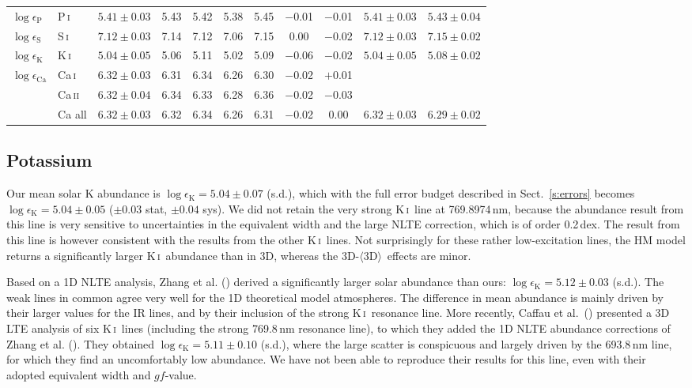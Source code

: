 \documentclass[traditabstract]{aa}
\newcommand{\ph}{\phantom{$-$}}
\newcommand{\oneDAV}{$\langle\mathrm{3D}\rangle$}
\newcommand{\altphosi}{P\,\textsc{i}}
\newcommand{\altsuli}{S\,\textsc{i}}
\newcommand{\altki}{K\,\textsc{i}}
\newcommand{\altcai}{Ca\,\textsc{i}}
\newcommand{\altcaii}{Ca\,\textsc{ii}}
\newcommand{\phosi}{\altphosi\ }
\newcommand{\suli}{\altsuli\ }
\newcommand{\ki}{\altki\ }
\newcommand{\cai}{\altcai\ }
\newcommand{\caii}{\altcaii\ }
\begin{document}
\begin{table}[tbp]
\begin{tabular}{l l c c c c c c c c c}
$\log \epsilon_\mathrm{P}$      & \phosi&  $5.41\pm0.03$ & 5.43 & 5.42 & 5.38 & 5.45 & $-$0.01 & $-$0.01 & $5.41\pm0.03$ & $5.43\pm0.04$ \vspace{1mm}\\
$\log \epsilon_\mathrm{S}$      & \suli &  $7.12\pm0.03$ & 7.14 & 7.12 & 7.06 & 7.15 & \ph0.00 & $-$0.02 & $7.12\pm0.03$ & $7.15\pm0.02$ \vspace{1mm}\\
$\log \epsilon_\mathrm{K}$      & \ki   &  $5.04\pm0.05$ & 5.06 & 5.11 & 5.02 & 5.09 & $-$0.06 & $-$0.02 & $5.04\pm0.05$ & $5.08\pm0.02$ \vspace{1mm}\\
$\log \epsilon_\mathrm{Ca}$     & \cai  &  $6.32\pm0.03$ & 6.31 & 6.34 & 6.26 & 6.30 & $-$0.02 & $+$0.01 & \\
                                			& \caii &  $6.32\pm0.04$ & 6.34 & 6.33 & 6.28 & 6.36 & $-$0.02 & $-$0.03 & \\
                                			& Ca all&  $6.32\pm0.03$ & 6.32 & 6.34 & 6.26 & 6.31 & $-$0.02 & \ph0.00 &  $6.32\pm0.03$ & $6.29\pm0.02$ \vspace{0.5mm}\\
\hline
\end{tabular}
\end{table}


\subsection{Potassium}
Our mean solar K abundance is $\log\epsilon_{\mathrm{K}} = 5.04 \pm  0.07$ (s.d.), which with the full error budget described in Sect.~\ref{s:errors} becomes $\log\epsilon_{\mathrm{K}} = 5.04 \pm 0.05$ ($\pm 0.03$ stat, $\pm 0.04$ sys). We did not retain the very strong \ki line at 769.8974\,nm, because the abundance result from this line is very sensitive to uncertainties in the equivalent width and the large NLTE correction, which is of order 0.2\,dex. The result from this line is however consistent with the results from the other \ki lines.  Not surprisingly for these rather low-excitation lines, the HM model returns a significantly larger \ki abundance than in 3D, whereas the 3D-\oneDAV\ effects are minor.

Based on a 1D NLTE analysis, Zhang et al. (\cite{zhan}) derived a significantly larger solar abundance than ours: $\log\epsilon_{\mathrm{K}} = 5.12 \pm  0.03$ (s.d.).  The weak lines in common agree very well for the 1D theoretical model atmospheres.  The difference in mean abundance is mainly driven by their larger values for the IR lines, and by their inclusion of the strong \ki resonance line.  More recently, Caffau et al.\ (\cite{caf4}) presented a 3D LTE analysis of six \ki lines (including the strong 769.8\,nm resonance line), to which they added the 1D NLTE abundance corrections of Zhang et al. (\cite{zhan}). They obtained $\log\epsilon_{\mathrm{K}} = 5.11 \pm  0.10$ (s.d.), where the large scatter is conspicuous and largely driven by the 693.8\,nm line, for which they find an uncomfortably low abundance. We have not been able to reproduce their results for this line, even with their adopted equivalent width and $gf$-value. 
\end{document}
